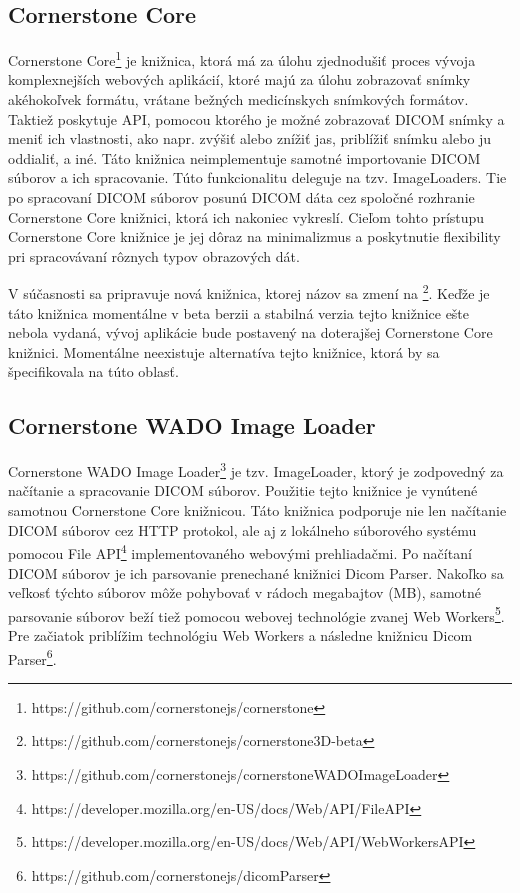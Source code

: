 \subsection {Cornerstone Core}
Cornerstone Core\footnote{https://github.com/cornerstonejs/cornerstone} je knižnica, ktorá má za úlohu zjednodušiť proces vývoja komplexnejších webových aplikácií, ktoré majú za úlohu zobrazovať snímky akéhokoľvek formátu, vrátane bežných medicínskych snímkových formátov. Taktiež poskytuje API, pomocou ktorého je možné zobrazovať DICOM snímky a meniť ich vlastnosti, ako napr. zvýšiť alebo znížiť jas, priblížiť snímku alebo ju oddialiť, a iné.
Táto knižnica neimplementuje samotné importovanie DICOM súborov a ich spracovanie. Túto funkcionalitu deleguje na tzv. ImageLoaders. Tie po spracovaní DICOM súborov posunú DICOM dáta cez spoločné rozhranie Cornerstone Core knižnici, ktorá ich nakoniec vykreslí. Cieľom tohto prístupu Cornerstone Core knižnice je jej dôraz na minimalizmus a poskytnutie flexibility pri spracovávaní rôznych typov obrazových dát.

V súčasnosti sa pripravuje nová  knižnica, ktorej názov sa zmení na \footnote{https://github.com/cornerstonejs/cornerstone3D-beta}. Keďže je táto knižnica momentálne v beta berzii a stabilná verzia tejto knižnice ešte nebola vydaná, vývoj aplikácie bude postavený na doterajšej Cornerstone Core knižnici.
Momentálne neexistuje alternatíva tejto knižnice, ktorá by sa špecifikovala na túto oblasť. 

\subsection {Cornerstone WADO Image Loader}
Cornerstone WADO Image Loader\footnote{https://github.com/cornerstonejs/cornerstoneWADOImageLoader} je tzv. ImageLoader, ktorý je zodpovedný za načítanie a spracovanie DICOM súborov. Použitie tejto knižnice je vynútené samotnou Cornerstone Core knižnicou. Táto knižnica podporuje nie len načítanie DICOM súborov cez HTTP protokol, ale aj z lokálneho súborového systému pomocou File API\footnote{https://developer.mozilla.org/en-US/docs/Web/API/File\textunderscore API} implementovaného webovými prehliadačmi. Po načítaní DICOM súborov je ich parsovanie prenechané knižnici Dicom Parser. Nakoľko sa veľkosť týchto súborov môže pohybovať v rádoch megabajtov (MB), samotné parsovanie súborov beží tiež pomocou webovej technológie zvanej Web Workers\footnote{https://developer.mozilla.org/en-US/docs/Web/API/Web\textunderscore Workers\textunderscore API}. Pre začiatok priblížim technológiu Web Workers a následne knižnicu Dicom Parser\footnote{https://github.com/cornerstonejs/dicomParser}.

